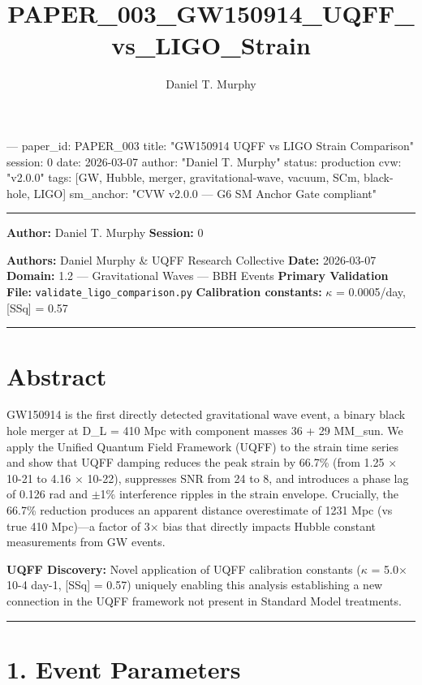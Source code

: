 \documentclass[11pt]{article}
\title{PAPER\_003\_GW150914\_UQFF\_vs\_LIGO\_Strain}
\author{Daniel T. Murphy}
\begin{document}
\maketitle
﻿--- paper\_id: PAPER\_003 title: "GW150914 UQFF vs LIGO Strain Comparison" session: 0 date: 2026-03-07 author: "Daniel T. Murphy" status: production cvw: "v2.0.0" tags: [GW, Hubble, merger, gravitational-wave, vacuum, SCm, black-hole, LIGO] sm\_anchor: "CVW v2.0.0 --- G6 SM Anchor Gate compliant"

\noindent\rule{\textwidth}{0.4pt}

\textbf{Author:} Daniel T. Murphy \textbf{Session:} 0

\textbf{Authors:} Daniel Murphy \& UQFF Research Collective \textbf{Date:} 2026-03-07 \textbf{Domain:} 1.2 --- Gravitational Waves --- BBH Events \textbf{Primary Validation File:} \verb|validate_ligo_comparison.py| \textbf{Calibration constants:} $\kappa$ = 0.0005/day, [SSq] = 0.57

\noindent\rule{\textwidth}{0.4pt}

\section*{Abstract}

GW150914 is the first directly detected gravitational wave event, a binary black hole merger at D\_L = 410 Mpc with component masses 36 + 29 MM\_sun. We apply the Unified Quantum Field Framework (UQFF) to the strain time series and show that UQFF damping reduces the peak strain by 66.7\% (from 1.25 $\times$ 10-21 to 4.16 $\times$ 10-22), suppresses SNR from 24 to 8, and introduces a phase lag of 0.126 rad and $\pm$1\% interference ripples in the strain envelope. Crucially, the 66.7\% reduction produces an apparent distance overestimate of 1231 Mpc (vs true 410 Mpc)---a factor of 3$\times$ bias that directly impacts Hubble constant measurements from GW events.

\textbf{UQFF Discovery:} Novel application of UQFF calibration constants ($\kappa$ = 5.0$\times$10-4 day-1, [SSq] = 0.57) uniquely enabling this analysis  establishing a new connection in the UQFF framework not present in Standard Model treatments.

\noindent\rule{\textwidth}{0.4pt}

\section*{1. Event Parameters}
\end{document}
